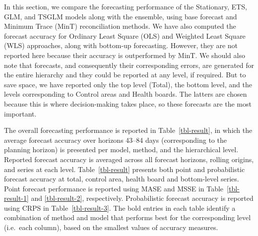 \documentclass[
  authoryear,
  preprint,
  3p]{elsarticle}
\begin{document}
In this section, we compare the forecasting performance of the
Stationary, ETS, GLM, and TSGLM models along with the ensemble, using
base forecast and Minimum Trace (MinT) reconciliation methods. We have
also computed the forecast accuracy for Ordinary Least Square (OLS) and
Weighted Least Square (WLS) approaches, along with bottom-up
forecasting. However, they are not reported here because their accuracy
is outperformed by MinT. We should also note that forecasts, and
consequently their corresponding errors, are generated for the entire
hierarchy and they could be reported at any level, if required. But to
save space, we have reported only the top level (Total), the bottom
level, and the levels corresponding to Control areas and Health boards.
The latters are chosen because this is where decision-making takes
place, so these forecasts are the most important.

The overall forecasting performance is reported in
Table~\ref{tbl-result}, in which the average forecast accuracy over
horizons 43--84 days (corresponding to the planning horizon) is
presented per model, method, and the hierarchical level. Reported
forecast accuracy is averaged across all forecast horizons, rolling
origins, and series at each level. Table~\ref{tbl-result} presents both
point and probabilistic forecast accuracy at total, control area, health
board and bottom-level series. Point forecast performance is reported
using MASE and MSSE in Table~\ref{tbl-result-1} and \ref{tbl-result-2},
respectively. Probabilistic forecast accuracy is reported using CRPS in
Table~\ref{tbl-result-3}. The bold entries in each table identify a
combination of method and model that performs best for the corresponding
level (i.e.~each column), based on the smallest values of accuracy
measures.
\end{document}
